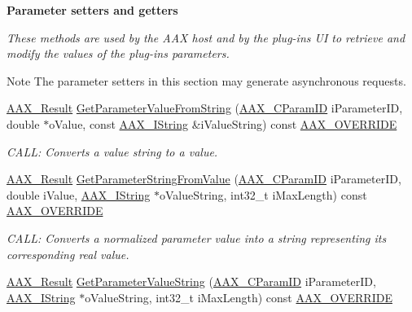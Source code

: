 \begin{Indent}\textbf{ Parameter setters and getters}\par
{\em These methods are used by the A\+AX host and by the plug-\/in\textquotesingle{}s UI to retrieve and modify the values of the plug-\/in\textquotesingle{}s parameters.

\begin{DoxyNote}{Note}
The parameter setters in this section may generate asynchronous requests. 
\end{DoxyNote}
}\begin{DoxyCompactItemize}
\item 
\mbox{\hyperlink{a00392_a4d8f69a697df7f70c3a8e9b8ee130d2f}{A\+A\+X\+\_\+\+Result}} \mbox{\hyperlink{a01481_af52682d9ba47701be0e803d19eb057a7}{Get\+Parameter\+Value\+From\+String}} (\mbox{\hyperlink{a00392_a1440c756fe5cb158b78193b2fc1780d1}{A\+A\+X\+\_\+\+C\+Param\+ID}} i\+Parameter\+ID, double $\ast$o\+Value, const \mbox{\hyperlink{a01873}{A\+A\+X\+\_\+\+I\+String}} \&i\+Value\+String) const \mbox{\hyperlink{a00392_ac2f24a5172689ae684344abdcce55463}{A\+A\+X\+\_\+\+O\+V\+E\+R\+R\+I\+DE}}
\begin{DoxyCompactList}\small\item\em C\+A\+LL\+: Converts a value string to a value. \end{DoxyCompactList}\item 
\mbox{\hyperlink{a00392_a4d8f69a697df7f70c3a8e9b8ee130d2f}{A\+A\+X\+\_\+\+Result}} \mbox{\hyperlink{a01481_a4d92debb4785a84356960ac8c633bf12}{Get\+Parameter\+String\+From\+Value}} (\mbox{\hyperlink{a00392_a1440c756fe5cb158b78193b2fc1780d1}{A\+A\+X\+\_\+\+C\+Param\+ID}} i\+Parameter\+ID, double i\+Value, \mbox{\hyperlink{a01873}{A\+A\+X\+\_\+\+I\+String}} $\ast$o\+Value\+String, int32\+\_\+t i\+Max\+Length) const \mbox{\hyperlink{a00392_ac2f24a5172689ae684344abdcce55463}{A\+A\+X\+\_\+\+O\+V\+E\+R\+R\+I\+DE}}
\begin{DoxyCompactList}\small\item\em C\+A\+LL\+: Converts a normalized parameter value into a string representing its corresponding real value. \end{DoxyCompactList}\item 
\mbox{\hyperlink{a00392_a4d8f69a697df7f70c3a8e9b8ee130d2f}{A\+A\+X\+\_\+\+Result}} \mbox{\hyperlink{a01481_a5ca62ebda52ddd423450eaa77f1d6968}{Get\+Parameter\+Value\+String}} (\mbox{\hyperlink{a00392_a1440c756fe5cb158b78193b2fc1780d1}{A\+A\+X\+\_\+\+C\+Param\+ID}} i\+Parameter\+ID, \mbox{\hyperlink{a01873}{A\+A\+X\+\_\+\+I\+String}} $\ast$o\+Value\+String, int32\+\_\+t i\+Max\+Length) const \mbox{\hyperlink{a00392_ac2f24a5172689ae684344abdcce55463}{A\+A\+X\+\_\+\+O\+V\+E\+R\+R\+I\+DE}}

\end{DoxyCompactItemize}
\end{Indent}
